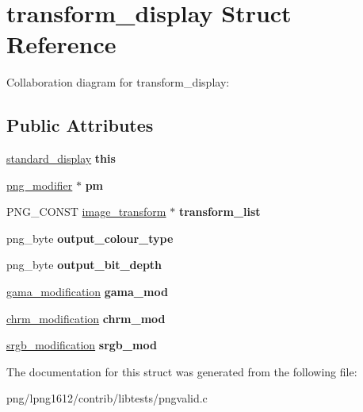 \hypertarget{structtransform__display}{\section{transform\+\_\+display Struct Reference}
\label{structtransform__display}
}


Collaboration diagram for transform\+\_\+display\+:
\subsection*{Public Attributes}
\begin{DoxyCompactItemize}
\item 
\hypertarget{structtransform__display_aa63ddce5964cecff170de3101ceb23a7}{\hyperlink{structstandard__display}{standard\+\_\+display} {\bfseries this}}\label{structtransform__display_aa63ddce5964cecff170de3101ceb23a7}

\item 
\hypertarget{structtransform__display_a2285990d38aa096f8f308bf1251c972c}{\hyperlink{structpng__modifier}{png\+\_\+modifier} $\ast$ {\bfseries pm}}\label{structtransform__display_a2285990d38aa096f8f308bf1251c972c}

\item 
\hypertarget{structtransform__display_af47653bed4a3b22f51912494b35d7a29}{P\+N\+G\+\_\+\+C\+O\+N\+S\+T \hyperlink{structimage__transform}{image\+\_\+transform} $\ast$ {\bfseries transform\+\_\+list}}\label{structtransform__display_af47653bed4a3b22f51912494b35d7a29}

\item 
\hypertarget{structtransform__display_ad0d44975a480b622e0d877a62a1432a1}{png\+\_\+byte {\bfseries output\+\_\+colour\+\_\+type}}\label{structtransform__display_ad0d44975a480b622e0d877a62a1432a1}

\item 
\hypertarget{structtransform__display_a0c5bf1dd959c82703ca6e685cb2f82a8}{png\+\_\+byte {\bfseries output\+\_\+bit\+\_\+depth}}\label{structtransform__display_a0c5bf1dd959c82703ca6e685cb2f82a8}

\item 
\hypertarget{structtransform__display_ac0126c5ad1e068a650b1f8b528315e1f}{\hyperlink{structgama__modification}{gama\+\_\+modification} {\bfseries gama\+\_\+mod}}\label{structtransform__display_ac0126c5ad1e068a650b1f8b528315e1f}

\item 
\hypertarget{structtransform__display_a49bdb76874decfc4bf92b9d8d4d498ac}{\hyperlink{structchrm__modification}{chrm\+\_\+modification} {\bfseries chrm\+\_\+mod}}\label{structtransform__display_a49bdb76874decfc4bf92b9d8d4d498ac}

\item 
\hypertarget{structtransform__display_a31738b4ddc3bb5f9af2feccf6a5df065}{\hyperlink{structsrgb__modification}{srgb\+\_\+modification} {\bfseries srgb\+\_\+mod}}\label{structtransform__display_a31738b4ddc3bb5f9af2feccf6a5df065}

\end{DoxyCompactItemize}


The documentation for this struct was generated from the following file\+:\begin{DoxyCompactItemize}
\item 
png/lpng1612/contrib/libtests/pngvalid.\+c\end{DoxyCompactItemize}
